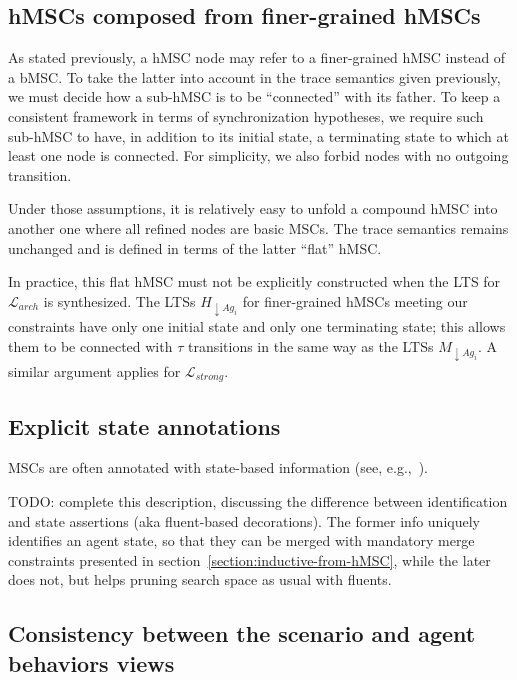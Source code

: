 \subsection*{hMSCs composed from finer-grained hMSCs}

As stated previously, a hMSC node may refer to a finer-grained hMSC instead of a bMSC. To take the latter into account in the trace semantics given previously, we must decide how a sub-hMSC is to be ``connected'' with its father. To keep a consistent framework in terms of synchronization hypotheses, we require such sub-hMSC to have, in addition to its initial state, a terminating state to which at least one node is connected. For simplicity, we also forbid nodes with no outgoing transition. 

Under those assumptions, it is relatively easy to unfold a compound hMSC into another one where all refined nodes are basic MSCs. The trace semantics remains unchanged and is defined in terms of the latter ``flat'' hMSC. 

In practice, this flat hMSC must not be explicitly constructed when the LTS for $\mathcal{L}_{arch}$ is synthesized. The LTSs $H_{\downarrow Ag_i}$ for finer-grained hMSCs meeting our constraints have only one initial state and only one terminating state; this allows them to be connected with $\tau$ transitions in the same way as the LTSs $M_{\downarrow Ag_i}$. A similar argument applies for $\mathcal{L}_{strong}$.

\subsection{Explicit state annotations\label{subsection:background-scenario-annotations}}

MSCs are often annotated with state-based information (see, e.g.,~\cite{VanLamsweerde:1998, Kruger:2000, Whittle:2000}). 

TODO: complete this description, discussing the difference between identification and state assertions (aka fluent-based decorations). The former info uniquely identifies an agent state, so that they can be merged with mandatory merge constraints presented in section~\ref{section:inductive-from-hMSC}, while the later does not, but helps pruning search space as usual with fluents.

\subsection{Consistency between the scenario and agent behaviors views\label{subsection:background-scenario-consistency}}

